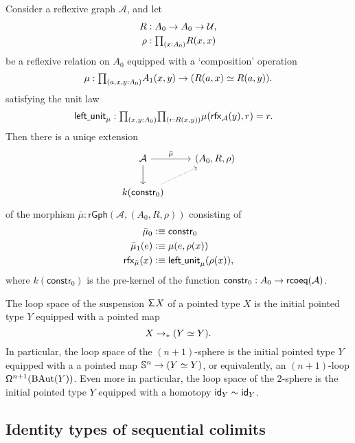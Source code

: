 \begin{thm}
Consider a reflexive graph $\mathcal{A}$, and let
\begin{align*}
R & : A_0 \to A_0 \to\UU, \\
\rho & : \prd{x:A_0}R(x,x)
\end{align*}
be a reflexive relation on $A_0$ equipped with a `composition' operation
\begin{equation*}
\mu:\prd{a,x,y:\pts{A}} \edg{A}(x,y) \to (\eqv{R(a,x)}{R(a,y)}).
\end{equation*}
satisfying the unit law
\begin{align*}
\mathsf{left\usc{}unit}_\mu & : \prd{x,y:\pts{A}}{r:R(x,y)} \mu(\rfx{\mathcal{A}}(y),r)=r.
\end{align*}
Then there is a uniqe extension
\begin{equation*}
\begin{tikzcd}
\mathcal{A} \arrow[r,"\bar{\mu}"] \arrow[d] & (A_0,R,\rho) \\
k(\mathsf{constr}_0) \arrow[ur,densely dotted]
\end{tikzcd}
\end{equation*}
of the morphism $\bar{\mu}:\mathsf{rGph}(\mathcal{A},(A_0,R,\rho))$ consisting of
\begin{align*}
\pts{\bar{\mu}} & \defeq \mathsf{constr}_0 \\
\edg{\bar{\mu}}(e) & \defeq \mu(e,\rho(x)) \\
\rfx{\bar{\mu}}(x) & \defeq \mathsf{left\usc{}unit}_\mu(\rho(x)),
\end{align*}
where $k(\mathsf{constr}_0)$ is the pre-kernel of the function $\mathsf{constr}_0:A_0\to\rcoeq(\mathcal{A})$.
\end{thm}

\begin{cor}
The loop space of the suspension $\susp X$ of a pointed type $X$ is the initial pointed type $Y$ equipped with a pointed map 
\begin{equation*}
X\to_\ast (\eqv{Y}{Y}).
\end{equation*}
In particular, the loop space of the $(n+1)$-sphere is the initial pointed type $Y$ equipped with a a pointed map $\sphere{n}\to (\eqv{Y}{Y})$, or equivalently, an $(n+1)$-loop $\loopspace[n+1]{\mathrm{BAut}(Y)}$. Even more in particular, the loop space of the $2$-sphere is the initial pointed type $Y$ equipped with a homotopy $\idfunc[Y]\htpy\idfunc[Y]$. 
\end{cor}

\subsection{Identity types of sequential colimits}

